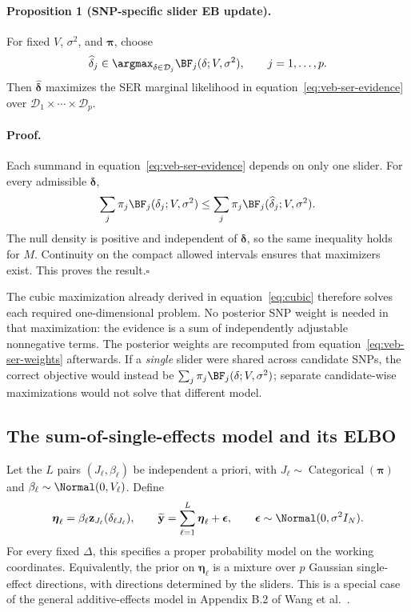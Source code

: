 \paragraph{Proposition 1 (SNP-specific slider EB update).}
For fixed $V$, $\sigma^2$, and $\boldsymbol\pi$, choose
\begin{equation}
\widehat\delta_j\in\argmax_{\delta\in\mathcal D_j}
       \BF_j(\delta;V,\sigma^2),\qquad j=1,\ldots,p.
\label{eq:veb-separate-maxima}
\end{equation}
Then $\widehat{\boldsymbol\delta}$ maximizes the SER marginal
likelihood in equation~\eqref{eq:veb-ser-evidence} over
$\mathcal D_1\times\cdots\times\mathcal D_p$.

\paragraph{Proof.}
Each summand in equation~\eqref{eq:veb-ser-evidence} depends on only
one slider. For every admissible $\boldsymbol\delta$,
\begin{equation}
\sum_j\pi_j\BF_j(\delta_j;V,\sigma^2)
 \leq\sum_j\pi_j\BF_j(\widehat\delta_j;V,\sigma^2).
\label{eq:veb-separability-proof}
\end{equation}
The null density is positive and independent of
$\boldsymbol\delta$, so the same inequality holds for $M$.
Continuity on the compact allowed intervals ensures that maximizers
exist. This proves the result.\hfill$\square$

The cubic maximization already derived in equation~\eqref{eq:cubic}
therefore solves each required one-dimensional problem. No posterior
SNP weight is needed in that maximization: the evidence is a sum of
independently adjustable nonnegative terms. The posterior weights
are recomputed from equation~\eqref{eq:veb-ser-weights} afterwards.
If a \emph{single} slider were shared across candidate SNPs, the
correct objective would instead be
$\sum_j\pi_j\BF_j(\delta;V,\sigma^2)$; separate candidate-wise
maximizations would not solve that different model.

\subsection{The sum-of-single-effects model and its ELBO}

Let the $L$ pairs $(J_\ell,\beta_\ell)$ be independent a priori,
with $J_\ell\sim\operatorname{Categorical}(\boldsymbol\pi)$ and
$\beta_\ell\sim\Normal(0,V_\ell)$. Define
\begin{equation}
\boldsymbol\eta_\ell
 =\beta_\ell\mathbf z_{J_\ell}(\delta_{\ell J_\ell}),\qquad
\widetilde{\mathbf y}=\sum_{\ell=1}^L\boldsymbol\eta_\ell
      +\boldsymbol\epsilon,\qquad
\boldsymbol\epsilon\sim\Normal(0,\sigma^2 I_N).
\label{eq:veb-sum-model}
\end{equation}
For every fixed $\Delta$, this specifies a proper probability model
on the working coordinates. Equivalently, the prior on
$\boldsymbol\eta_\ell$ is a mixture over $p$ Gaussian single-effect
directions, with directions determined by the sliders. This is a
special case of the general additive-effects model in Appendix B.2
of Wang et al.~\cite{wang2018susie}.

